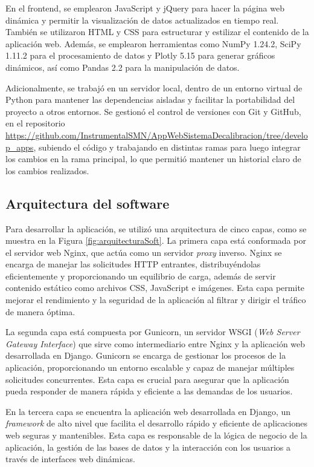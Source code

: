 En el frontend, se emplearon JavaScript y jQuery para hacer la página web dinámica y permitir la visualización de datos actualizados en tiempo real. También se utilizaron HTML y CSS para estructurar y estilizar el contenido de la aplicación web. Además, se emplearon herramientas como NumPy 1.24.2, SciPy  1.11.2 para el procesamiento de datos y Plotly 5.15 para generar gráficos dinámicos, así como Pandas 2.2 para la manipulación de datos.

Adicionalmente, se trabajó en un servidor local, dentro de un entorno virtual de Python para mantener las dependencias aisladas y facilitar la portabilidad del proyecto a otros entornos. Se gestionó el control de versiones con Git y GitHub, en el repositorio \url{https://github.com/InstrumentalSMN/AppWebSistemaDecalibracion/tree/develop_apps}, subiendo el código y trabajando en distintas ramas para luego integrar los cambios en la rama principal, lo que permitió mantener un historial claro de los cambios realizados.
\subsection{Arquitectura del software}
Para desarrollar la aplicación, se utilizó una arquitectura de cinco capas, como se muestra en la Figura \ref{fig:arquitecturaSoft}. La primera capa está conformada por el servidor web Nginx, que actúa como un servidor \textit{proxy} inverso. Nginx se encarga de manejar las solicitudes HTTP entrantes, distribuyéndolas eficientemente y proporcionando un equilibrio de carga, además de servir contenido estático como archivos CSS, JavaScript e imágenes. Esta capa permite mejorar el rendimiento y la seguridad de la aplicación al filtrar y dirigir el tráfico de manera óptima.

La segunda capa está compuesta por Gunicorn, un servidor WSGI (\textit{Web Server Gateway Interface}) que sirve como intermediario entre Nginx y la aplicación web desarrollada en Django. Gunicorn se encarga de gestionar los procesos de la aplicación, proporcionando un entorno escalable y capaz de manejar múltiples solicitudes concurrentes. Esta capa es crucial para asegurar que la aplicación pueda responder de manera rápida y eficiente a las demandas de los usuarios.

En la tercera capa se encuentra la aplicación web desarrollada en Django, un \textit{framework} de alto nivel que facilita el desarrollo rápido y eficiente de aplicaciones web seguras y mantenibles.  Esta capa es responsable de la lógica de negocio de la aplicación, la gestión de las bases de datos y la interacción con los usuarios a través de interfaces web dinámicas.


